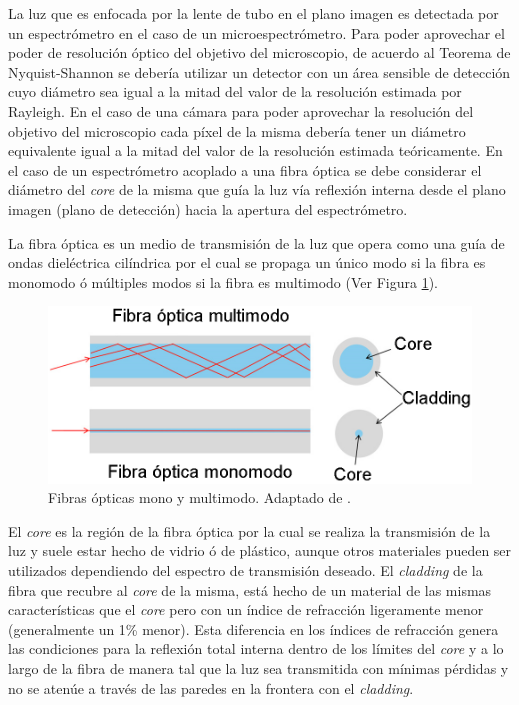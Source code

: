 La luz que es enfocada por la lente de tubo en el plano imagen es detectada por un espectrómetro en el caso de un microespectrómetro. Para poder aprovechar el poder de resolución óptico del objetivo del microscopio, de acuerdo al Teorema de Nyquist-Shannon se debería utilizar un detector con un área sensible de detección cuyo diámetro sea igual a la mitad del valor de la resolución estimada por Rayleigh. En el caso de una cámara para poder aprovechar la resolución del objetivo del microscopio cada píxel de la misma debería tener un diámetro equivalente igual a la mitad del valor de la resolución estimada teóricamente. En el caso de un espectrómetro acoplado a una fibra óptica se debe considerar el diámetro del \textit{core} de la misma que guía la luz vía reflexión interna desde el plano imagen (plano de detección) hacia la apertura del espectrómetro.

La fibra óptica es un medio de transmisión de la luz que opera como una guía de ondas dieléctrica cilíndrica por el cual se propaga un único modo si la fibra es monomodo ó múltiples modos si la fibra es multimodo (Ver Figura \ref{fig:guiasmon}). 
\begin{figure}[H]
	\centering
	\includegraphics[width=1.0\textwidth]{Figs/introduccion/guias.png}
	\caption{Fibras ópticas mono y multimodo. Adaptado de \cite{dintek}.}
	\label{fig:guiasmon}
\end{figure}
El \textit{core} es la región de la fibra óptica por la cual se realiza la transmisión de la luz y suele estar hecho de vidrio ó de plástico, aunque otros materiales pueden ser utilizados dependiendo del espectro de transmisión deseado. El \textit{cladding} de la fibra que recubre al \textit{core} de la misma, está hecho de un material de las mismas características que el \textit{core} pero con un índice de refracción ligeramente menor (generalmente un 1\% menor)\cite{hecht2012optics}. Esta diferencia en los índices de refracción genera las condiciones para la reflexión total interna dentro de los límites del \textit{core} y a lo largo de la fibra de manera tal que la luz sea transmitida con mínimas pérdidas y no se atenúe a través de las paredes en la frontera con el \textit{cladding}. 

